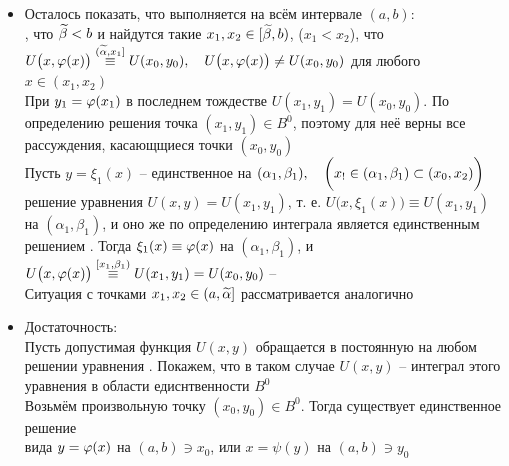 \begin{iproof}
\begin{itemize}
        Иными словами, сущетвуют такие интервалы $ (\vawe{a}, \vawe{b}) $ и $ (\vawe\alpha, \vawe\beta) $, что
        $$ x_0 \in (\vawe{a}, \vawe{b}) \sub (a, b), \quad y_0 \in (\vawe\alpha, \vawe\beta) \sub (\alpha, \beta), \qquad y \overset{(\vawe\alpha, \vawe\beta)}\equiv \vphi \big( \eta(y) \big), \quad x \overset{(\vawe{a}, \vawe{b})}\equiv \eta \big( \vphi(x) \big) $$
        Поэтому справедлива доказывающая  цепочка равенств:
        $$ U \big( x, \vphi(x) \big) \overset{)\vawe{a}, \vawe{b}}\equiv U \bigg( \eta \big( \vphi(x) \big), \vphi(x) \bigg) \overset{(\vawe\alpha, \vawe\beta)}\equiv U \big( \eta(y), y \big) \overset{(\vawe\alpha, \vawe\beta)}\equiv U(x_0, y_0) $$
        \item Осталось показать, что  выполняется на всём интервале $ (a, b) $: \\
        , что $ \widetilde\beta < b $ и найдутся такие $ x_1, x_2 \in [\widetilde\beta, b) $, ($ x_1 < x_2 $), что $ U \big( x, \varphi(x) \big) \overset{(\widetilde\alpha, x_1]}\equiv U(x_0, y_0), \quad U \big( x, \varphi(x) \big) \neq U(x_0, y_0) $ для любого $ x \in (x_1, x_2) $ \\
        При $ y_1 = \varphi(x_1) $ в последнем тождестве $ U(x_1, y_1) = U(x_0, y_0) $. По определению решения точка $ (x_1, y_1) \in B^0 $, поэтому для неё верны все рассуждения, касающщиеся точки $ (x_0, y_0) $ \\
        Пусть $ y = \xi_1(x) $ -- единственное на $ (\alpha_1, \beta_1), \quad \bigg( x_! \in (\alpha_1, \beta_1) \subset (x_0, x_2) \bigg) $ решение уравнения $ U(x, y) = U(x_1, y_1) $, т. е. $ U \big( x, \xi_1(x) \big) \equiv U(x_1, y_1) $ на $ (\alpha_1, \beta_1) $, и оно же по определению интеграла является единственным решением . Тогда $ \xi_1(x) \equiv \varphi(x) $ на $ (\alpha_1, \beta_1) $, и $ U \big( x, \varphi(x) \big) \overset{[x_1, \beta_1)}\equiv U(x_1, y_1) = U(x_0, y_0) $ -- \contra \\
        Ситуация с точками $ x_1, x_2 \in (a, \widetilde\alpha] $ рассматривается аналогично
        \item Достаточность: \\
        Пусть допустимая функция $ U(x, y) $ обращается в постоянную на любом решении уравнения . Покажем, что в таком случае $ U(x, y) $ -- интеграл этого уравнения в области едиснтвенности $ B^0 $ \\
        Возьмём произвольную точку $ (x_0, y_0) \in B^0 $. Тогда существует единственное решение \\  вида $ y = \varphi(x) $ на $ (a ,b) \ni x_0 $, или $ x = \psi(y) $ на $ (a, b) \ni y_0 $ \\

\end{itemize}
\end{iproof}
